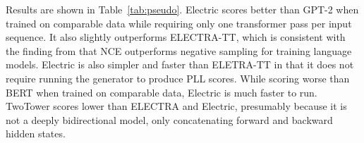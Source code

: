 \documentclass[11pt,a4paper]{article}
\begin{document}
Results are shown in Table~\ref{tab:pseudo}.
Electric scores better than GPT-2 when trained on comparable data while requiring only one transformer pass per input sequence. 
It also slightly outperforms ELECTRA-TT, which is consistent with the finding from \citet{Labeau2018LearningWN} that NCE outperforms negative sampling for training language models.
Electric is also simpler and faster than ELETRA-TT in that it does not require running the generator to produce PLL scores.
While scoring worse than BERT when trained on comparable data, Electric is much faster to run.
TwoTower scores lower than ELECTRA and Electric, presumably because it is not a deeply bidirectional model, only concatenating forward and backward hidden states.
\end{document}
